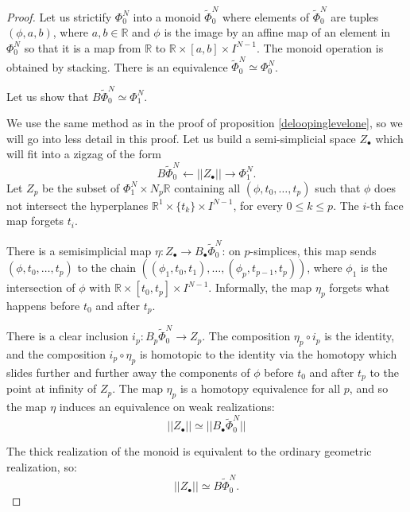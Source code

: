 \documentclass[12pt]{amsart}
\theoremstyle{plain}
\theoremstyle{definition}
\theoremstyle{remark}
\begin{document}
\begin{proof}
Let us strictify $\Phi_0^N$ into a monoid $\tilde{\Phi}_0^N$ where elements of $\tilde{\Phi}_0^N$ are tuples $(\phi,a,b)$, where $a,b\in\mathbb{R}$ and $\phi$ is the image by an affine map 
of an element in $\Phi_0^N$ so that it is a map from $\mathbb{R}$ to $\mathbb{R}\times [a,b]\times I^{N-1}$.
The monoid operation is obtained by stacking.
There is an equivalence $\tilde{\Phi}_0^N\simeq \Phi_0^N$.

Let us show that $B \tilde{\Phi}_0^N \simeq \Phi_1^N$.

We use the same method as in the proof of proposition \ref{deloopinglevelone}, so we will go into less detail in this proof.
Let us build a semi-simplicial space $Z_\bullet$ which will fit into a zigzag of the form
\[B \tilde{\Phi}_0^N \leftarrow \vert\vert Z_\bullet\vert\vert \rightarrow \Phi_1^N.\]
Let $Z_p$ be the subset of $\Phi_{1}^N\times N_p\mathbb{R}$ containing all $(\phi,t_0,\dots, t_p)$ such that $\phi$ does not intersect the hyperplanes $\mathbb{R}^{1}\times \{t_k\}\times I^{N-1}$, for every $0\leq k \leq p$.
The $i$-th face map forgets $t_i$.

There is a semisimplicial map $\eta: Z_\bullet\rightarrow B_\bullet \tilde{\Phi}_0^N$:
on $p$-simplices, this map sends $(\phi,t_0,\dots, t_p)$ to the chain $\left((\phi_1,t_0,t_1),\dots, (\phi_p,t_{p-1},t_p)\right)$,
where $\phi_1$ is the intersection of $\phi$ with $\mathbb{R}\times [t_0,t_p]\times I^{N-1}$.
Informally, the map $\eta_p$ forgets what happens before $t_0$ and after $t_p$.

There is a clear inclusion $i_p: B_p \tilde{\Phi}_0^N \rightarrow Z_p$.
The composition $\eta_p\circ i_p$ is the identity, and the composition $i_p\circ \eta_p$ is homotopic to the identity via the homotopy 
which slides further and further away the components of $\phi$ before $t_0$ and after $t_p$ to the point at infinity of $Z_p$.
The map $\eta_p$ is a homotopy equivalence for all $p$, and so the map $\eta$ induces an equivalence on weak realizations:
\[\vert\vert Z_\bullet\vert\vert \simeq  \vert\vert B_\bullet \tilde{\Phi}_0^N\vert\vert\]

The thick realization of the monoid is equivalent to the ordinary geometric realization, so:
\[\vert\vert Z_\bullet\vert\vert \simeq B\tilde{\Phi}_0^N.\]


\end{proof}
\end{document}

